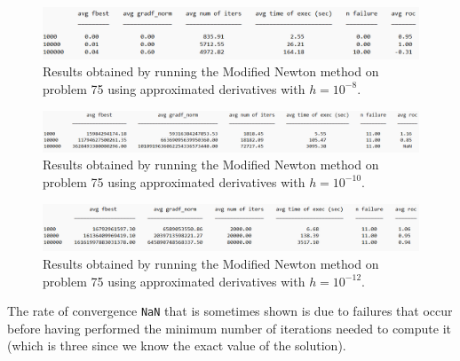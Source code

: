 \begin{figure}[H]
    \centering
    \includegraphics[width=1\textwidth]{img/pb75_table_MN_COST_8.png}
    \caption{Results obtained by running the Modified Newton method on problem 75 using approximated derivatives with $h=10^{-8}$.} 
\end{figure}

\begin{figure}[H]
    \centering
    \includegraphics[width=1\textwidth]{img/pb75_table_MN_COST_10.png}
    \caption{Results obtained by running the Modified Newton method on problem 75 using approximated derivatives with $h=10^{-10}$.} 
\end{figure}

\begin{figure}[H]
    \centering
    \includegraphics[width=1\textwidth]{img/pb75_table_MN_COST_12.png}
    \caption{Results obtained by running the Modified Newton method on problem 75 using approximated derivatives with $h=10^{-12}$.} 
\end{figure}


The rate of convergence \texttt{NaN} that is sometimes shown is due to failures that occur before having performed the minimum number of iterations 
needed to compute it (which is three since we know the exact value of the solution).

